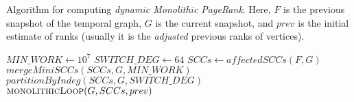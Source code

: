 \begin{algorithm}[!hbtp]
\caption{Algorithm for computing \emph{dynamic Monolithic PageRank}. Here, $F$ is the previous snapshot of the temporal graph, $G$ is the current snapshot, and $prev$ is the initial estimate of ranks (usually it is the \emph{adjusted} previous ranks of vertices).}
\label{alg:monolithic}
\begin{algorithmic}
  \State $MIN\_WORK \gets 10^7$ 
  \State $SWITCH\_DEG \gets 64$ 
  \State $SCCs \gets affectedSCCs(F, G)$
    \State $mergeMiniSCCs(SCCs, G, MIN\_WORK)$
    \State $partitionByIndeg(SCCs, G, SWITCH\_DEG)$
  \EndIf
  \Return $\textsc{monolithicLoop}(G, SCCs, prev)$ \\  
\EndFunction
\end{algorithmic}
\end{algorithm}
